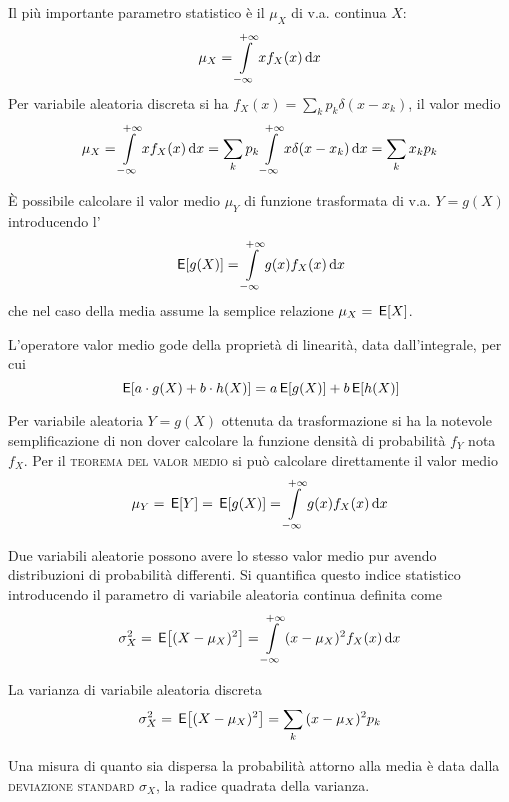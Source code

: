 Il più importante parametro statistico è il  $\mu_X$ di v.a. continua $X$:
\begin{equation}\label{eq:v_a_media}
\mu_X=\int\limits_{-\infty}^{+\infty}{x f_X(x)}{\,\mathop{}\!\mathrm{d}{x}}
\end{equation}
Per variabile aleatoria discreta si ha $f_X(x)=\sum_k p_k\delta(x-x_k)$, il valor medio
\begin{equation}\label{eq:v_a_discreta_media}
\mu_X=\int\limits_{-\infty}^{+\infty}{x f_X(x)}{\,\mathop{}\!\mathrm{d}{x}}=\sum_k p_k \int\limits_{-\infty}^{+\infty}{x \delta(x-x_k)}{\,\mathop{}\!\mathrm{d}{x}}=\sum_k x_k p_k
\end{equation}

\`{E} possibile calcolare il valor medio $\mu_Y$ di funzione trasformata di v.a. $Y=g(X)$ introducendo l'
\begin{equation}
\,{\operatorname{\mathsf{E}}}\!\left[{g(X)}\right]=\int\limits_{-\infty}^{+\infty}{g(x)f_X(x)}{\,\mathop{}\!\mathrm{d}{x}}
\end{equation}
che nel caso della media assume la semplice relazione $\mu_X=\,{\operatorname{\mathsf{E}}}\!\left[{X}\right]$.

L'operatore valor medio gode della proprietà di linearità, data dall'integrale, per cui
\begin{equation}\,{\operatorname{\mathsf{E}}}\!\left[{a\cdot g(X)+b\cdot h(X)}\right]=a \,{\operatorname{\mathsf{E}}}\!\left[{g(X)}\right]+b \,{\operatorname{\mathsf{E}}}\!\left[{h(X)}\right]\end{equation}

Per variabile aleatoria $Y=g(X)$ ottenuta da trasformazione si ha la notevole semplificazione di non dover calcolare la funzione densità di probabilità $f_Y$ nota $f_X$.
Per il \textsc{teorema del valor medio} si può calcolare direttamente il valor medio
\begin{equation}\label{eq:teo_valor_medio}
\mu_Y=\,{\operatorname{\mathsf{E}}}\!\left[{Y}\right]=\,{\operatorname{\mathsf{E}}}\!\left[{g(X)}\right]=\int\limits_{-\infty}^{+\infty}{g(x) f_X(x)}{\,\mathop{}\!\mathrm{d}{x}}
\end{equation}

Due variabili aleatorie possono avere lo stesso valor medio pur avendo distribuzioni di probabilità differenti. Si quantifica questo indice statistico introducendo il parametro  di variabile aleatoria continua definita come
\begin{equation}\label{eq:v_a_varianza}
\sigma^2_X=\,{\operatorname{\mathsf{E}}}\!\left[{(X-\mu_X)^2}\right]=\int\limits_{-\infty}^{+\infty}{(x-\mu_X)^2 f_X(x)}{\,\mathop{}\!\mathrm{d}{x}}
\end{equation}

La varianza di variabile aleatoria discreta
\begin{equation}\label{eq:v_a_varianza_discreta}
\sigma^2_X=\,{\operatorname{\mathsf{E}}}\!\left[{(X-\mu_X)^2}\right]=\sum_k {(x-\mu_X)^2 p_k}
\end{equation}

Una misura di quanto sia dispersa la probabilità attorno alla media è data dalla \textsc{deviazione standard} $\sigma_X$, la radice quadrata della varianza.\\

